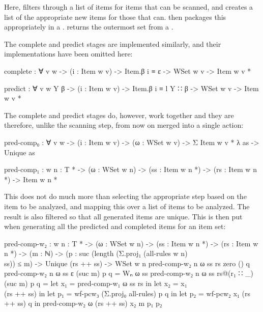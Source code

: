 		Here,  filters through a list of items for items
		that can be scanned, and creates a list of the appropriate new items
		for those that can.  then packages this appropriately
		in a .  returns the outermost set from a
		.

		The complete and predict stages are implemented similarly, and their
		implementations have been omitted here:

		\begin{code}
			complete : ∀ {v w} -> (i : Item w v) -> Item.β i ≡ ε ->
			  WSet w v -> Item w v *

			predict : ∀ {v w Y β} -> (i : Item w v) -> Item.β i ≡ l Y ∷ β ->
			  WSet w v -> Item w v *
		\end{code}

 		The complete and predict stages do, however, work together and they are
 		therefore, unlike the scanning step, from now on merged into a single
 		action:

		\begin{code}
			pred-comp₀ : ∀ {v w} ->
			  (i : Item w v) ->
			  (ω : WSet w v) ->
			  Σ {Item w v *} λ as -> Unique as

			pred-comp₁ : {w n : T *} -> (ω : WSet w n) ->
			  (ss : Item w n *) -> (rs : Item w n *) -> Item w n *
		\end{code}

		This does not do much more than selecting the appropriate step based on
		the item to be analyzed, and mapping this over a list of items to be
		analyzed. The result is also filtered so that all generated items are
		unique. This is then put when generating all the predicted and
		completed items for an item set:

		\begin{code}
			pred-comp-w₂ : {w n : T *} ->
			  (ω : WSet w n) ->
			  (ss : Item w n *) ->
			  (rs : Item w n *) ->
			  (m : ℕ) ->
			  (p : suc (length (Σ.proj₁ (all-rules {w} {n}) \\ ss)) ≤ m) ->
			  Unique (rs ++ ss) ->
			  WSet w n
			pred-comp-w₂ {n} ω ss rs zero () q
			pred-comp-w₂ {n} ω ss ε (suc m) p q = Wₙ ω ss
			pred-comp-w₂ {n} ω ss rs@(r₁ ∷ _) (suc m) p q =
			  let x₁ = pred-comp-w₁ ω ss rs in
			  let x₂ = x₁ \\ (rs ++ ss) in
			  let p₁ = wf-pcw₃ (Σ.proj₀ all-rules) p q in
			  let p₂ = wf-pcw₂ x₁ (rs ++ ss) q in
			  pred-comp-w₂ ω (rs ++ ss) x₂ m p₁ p₂
		\end{code}

